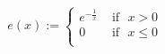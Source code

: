 \documentclass[preview]{standalone}
\begin{document}
\begin{align*}
e(x) := \begin{cases}e^{-\frac{1}{x}} &  \text{ if} \ \ \  x > 0 \\0 &  \text{ if} \ \ \ x \leq 0 \\\end{cases}
\end{align*}
\end{document}
